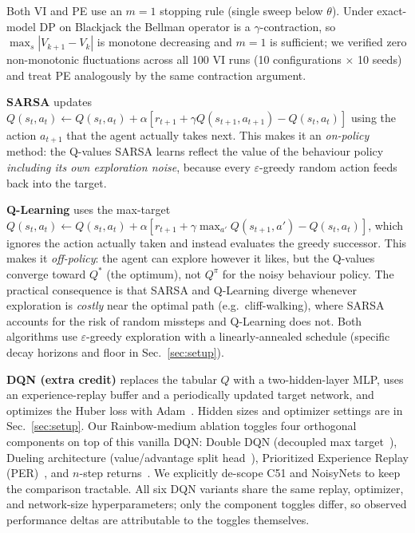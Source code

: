 \documentclass[conference]{IEEEtran}
\begin{document}
Both VI and PE use an $m = 1$ stopping rule (single sweep below
$\theta$). Under exact-model DP on Blackjack the Bellman
operator is a $\gamma$-contraction, so $\max_s |V_{k+1} - V_k|$
is monotone decreasing and $m = 1$ is sufficient; we verified
zero non-monotonic fluctuations across all 100 VI runs (10
configurations $\times$ 10 seeds) and treat PE analogously by
the same contraction argument.

\textbf{SARSA} updates
$Q(s_t, a_t) \leftarrow Q(s_t, a_t) + \alpha[r_{t+1} + \gamma Q(s_{t+1},
a_{t+1}) - Q(s_t, a_t)]$ using the action $a_{t+1}$ that the agent
actually takes next. This makes it an \emph{on-policy} method: the
Q-values SARSA learns reflect the value of the behaviour policy
\emph{including its own exploration noise}, because every $\varepsilon$-greedy
random action feeds back into the target.

\textbf{Q-Learning} uses the max-target
$Q(s_t, a_t) \leftarrow Q(s_t, a_t) + \alpha[r_{t+1} + \gamma \max_{a'}
Q(s_{t+1}, a') - Q(s_t, a_t)]$, which ignores the action actually taken
and instead evaluates the greedy successor. This makes it
\emph{off-policy}: the agent can explore however it likes, but the
Q-values converge toward $Q^*$ (the optimum), not $Q^\pi$ for the noisy
behaviour policy. The practical consequence is that SARSA and Q-Learning diverge whenever exploration
is \emph{costly} near the optimal path (e.g.\ cliff-walking), where SARSA
accounts for the risk of random missteps and Q-Learning does not. Both
algorithms use $\varepsilon$-greedy exploration with a linearly-annealed
schedule (specific decay horizons and floor in
Sec.~\ref{sec:setup}).

\textbf{DQN (extra credit)} replaces the tabular $Q$ with a two-hidden-layer
MLP, uses an experience-replay buffer and a periodically updated target
network, and optimizes the Huber loss with Adam~\cite{mnih2015}. Hidden
sizes and optimizer settings are in Sec.~\ref{sec:setup}. Our Rainbow-medium ablation toggles four orthogonal
components on top of this vanilla DQN: Double DQN (decoupled max
target~\cite{vanhasselt2016}), Dueling architecture (value/advantage split
head~\cite{wang2016}), Prioritized Experience Replay
(PER)~\cite{schaul2016}, and $n$-step returns~\cite{sutton1988}. We
explicitly de-scope C51 and NoisyNets to keep the comparison tractable. All
six DQN variants share the same replay, optimizer, and network-size
hyperparameters; only the component toggles differ, so observed performance
deltas are attributable to the toggles themselves.
\end{document}
